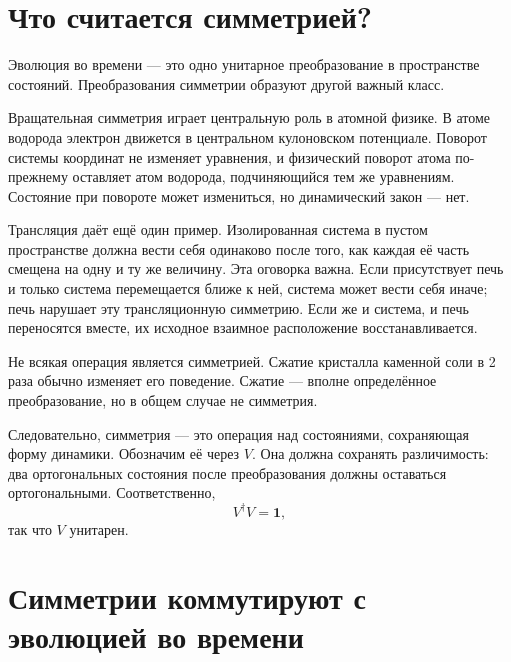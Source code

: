 \begin{classroomqa}
\end{classroomqa}

\section{Что считается симметрией?}

Эволюция во времени — это одно унитарное преобразование в пространстве состояний. Преобразования симметрии образуют другой важный класс.

Вращательная симметрия играет центральную роль в атомной физике. В атоме водорода электрон движется в центральном кулоновском потенциале. Поворот системы координат не изменяет уравнения, и физический поворот атома по-прежнему оставляет атом водорода, подчиняющийся тем же уравнениям. Состояние при повороте может измениться, но динамический закон — нет.

Трансляция даёт ещё один пример. Изолированная система в пустом пространстве должна вести себя одинаково после того, как каждая её часть смещена на одну и ту же величину. Эта оговорка важна. Если присутствует печь и только система перемещается ближе к ней, система может вести себя иначе; печь нарушает эту трансляционную симметрию. Если же и система, и печь переносятся вместе, их исходное взаимное расположение восстанавливается.

Не всякая операция является симметрией. Сжатие кристалла каменной соли в 2 раза обычно изменяет его поведение. Сжатие — вполне определённое преобразование, но в общем случае не симметрия.

Следовательно, симметрия — это операция над состояниями, сохраняющая форму динамики. Обозначим её через \(V\). Она должна сохранять различимость: два ортогональных состояния после преобразования должны оставаться ортогональными. Соответственно,
\begin{equation}
V^\dagger V=\mathbf 1,
\end{equation}
так что \(V\) унитарен.

\section{Симметрии коммутируют с эволюцией во времени}


